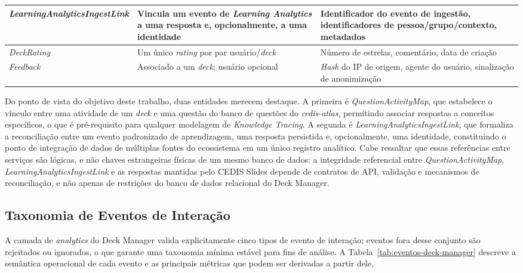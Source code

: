 \begin{table}[htb]
\begin{tabularx}{\textwidth}{l>{\raggedright\arraybackslash}X>{\raggedright\arraybackslash}X}
\hline
\textit{LearningAnalyticsIngestLink} & Vincula um evento de \textit{Learning Analytics} a uma resposta e, opcionalmente, a uma identidade & Identificador do evento de ingestão, identificadores de pessoa/grupo/contexto, metadados \\
\hline
\textit{DeckRating} & Um único \textit{rating} por par usuário/\textit{deck} & Número de estrelas, comentário, data de criação \\
\hline
\textit{Feedback} & Associado a um \textit{deck}; usuário opcional & \textit{Hash} do IP de origem, agente do usuário, sinalização de anonimização \\
\hline
\end{tabularx}
\end{table}

Do ponto de vista do objetivo deste trabalho, duas entidades merecem
destaque. A primeira é \textit{QuestionActivityMap}, que estabelece o
vínculo entre uma atividade de um \textit{deck} e uma questão do banco de
questões do \textit{cedis-atlas}, permitindo associar respostas a conceitos
específicos, o que é pré-requisito para qualquer modelagem de \textit{Knowledge
Tracing}. A segunda é \textit{LearningAnalyticsIngestLink}, que formaliza
a reconciliação entre um evento padronizado de aprendizagem, uma resposta
persistida e, opcionalmente, uma identidade, constituindo o ponto de
integração de dados de múltiplas fontes do ecossistema em um único
registro analítico. Cabe ressaltar que essas referências entre serviços
são lógicas, e não chaves estrangeiras físicas de um mesmo banco de
dados: a integridade referencial entre \textit{QuestionActivityMap},
\textit{LearningAnalyticsIngestLink} e as respostas mantidas pelo CEDIS
Slides depende de contratos de API, validação e mecanismos de
reconciliação, e não apenas de restrições do banco de dados relacional do
Deck Manager.

\subsection{Taxonomia de Eventos de Interação}
\label{subsec:taxonomia-eventos}

A camada de \textit{analytics} do Deck Manager valida explicitamente cinco
tipos de evento de interação; eventos fora desse conjunto são rejeitados
ou ignorados, o que garante uma taxonomia mínima estável para fins de
análise. A Tabela~\ref{tab:eventos-deck-manager} descreve a semântica
operacional de cada evento e as principais métricas que podem ser
derivadas a partir dele.

